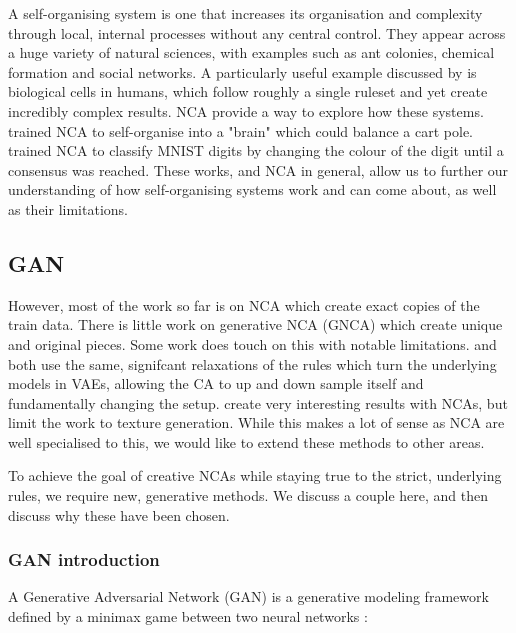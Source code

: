 \documentclass[12pt]{report}
\begin{document}
A self-organising system is one that increases its organisation and complexity through local, internal processes without any central control. They appear across a huge variety of natural sciences, with examples such as ant colonies, chemical formation and social networks. A particularly useful example discussed by \cite{mordvintsev2020growing} is biological cells in humans, which follow roughly a single ruleset and yet create incredibly complex results. NCA provide a way to explore how these systems. \cite{variengien2021towards} trained NCA to self-organise into a "brain" which could balance a cart pole. \cite{randazzo2020self-classifying} trained NCA to classify MNIST digits by changing the colour of the digit until a consensus was reached. These works, and NCA in general, allow us to further our understanding of how self-organising systems work and can come about, as well as their limitations. 

\subsection{GAN}

However, most of the work so far is on NCA which create exact copies of the train data. There is little work on generative NCA (GNCA) which create unique and original pieces. Some work does touch on this with notable limitations. \cite{palm2022variational} and \cite{kalkhof2024frequencytime} both use the same, signifcant relaxations of the rules which turn the underlying models in VAEs, allowing the CA to up and down sample itself and fundamentally changing the setup. \cite{niklasson2021self-organising} create very interesting results with NCAs, but limit the work to texture generation. While this makes a lot of sense as NCA are well specialised to this, we would like to extend these methods to other areas. 

To achieve the goal of creative NCAs while staying true to the strict, underlying rules, we require new, generative methods. We discuss a couple here, and then discuss why these have been chosen.

\subsubsection{GAN introduction}

A Generative Adversarial Network (GAN) is a generative modeling framework defined by a minimax game between two neural networks \cite{goodfellow2014GAN}:
\end{document}
